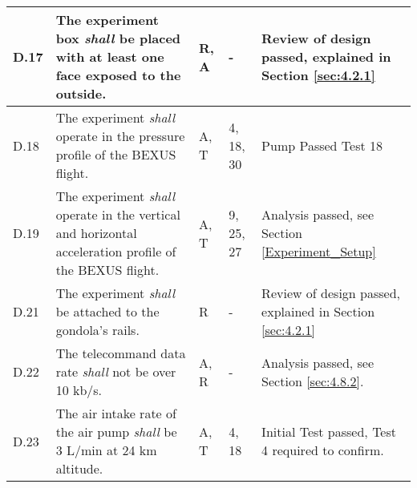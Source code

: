 \begin{longtable}[]{|m{}| m{} |m{} |m{}|m{}|}
D.17 & The experiment box \textit{shall} be placed with at least one face exposed to the outside.                                                                                &     R, A         & -            &   Review of design passed, explained in Section \ref{sec:4.2.1}     
\\ \hline
D.18 & The  experiment \textit{shall} operate  in  the  pressure  profile  of  the BEXUS flight.\cite{BexusManual}                                                                              &    A, T         & 4, 18, 30 &  Pump Passed Test 18     
\\ \hline
D.19 & The  experiment \textit{shall} operate  in  the  vertical  and  horizontal  acceleration  profile  of  the BEXUS flight.\cite{BexusManual}                                                                              &    A, T         & 9, 25, 27            &   Analysis passed, see Section \ref{Experiment_Setup}    
\\ \hline
D.21 & The experiment \textit{shall} be attached to the gondola’s rails.                                                                                &     R         & -            &  Review of design passed, explained in Section \ref{sec:4.2.1}     
\\ \hline
D.22 & The telecommand data rate \textit{shall} not be over 10 kb/s.                                                                               &     A, R         & -            &    Analysis passed, see Section \ref{sec:4.8.2}.   
\\  \hline

D.23 & The air intake rate of the air pump \textit{shall} be 3 L/min at 24 km altitude.                                                                                                                        &       A, T        & 4, 18            &  Initial Test passed, Test 4 required to confirm.      \\ \hline


\end{longtable}
